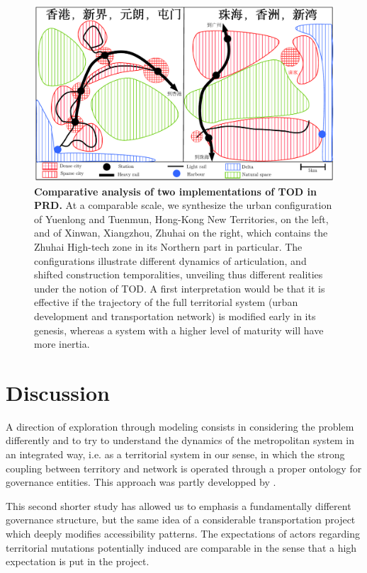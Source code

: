 \begin{figure}
	\includegraphics[width=\linewidth]{figures/tod.pdf}
	\caption{\textbf{Comparative analysis of two implementations of TOD in PRD.} At a comparable scale, we synthesize the urban configuration of Yuenlong and Tuenmun, Hong-Kong New Territories, on the left, and of Xinwan, Xiangzhou, Zhuhai on the right, which contains the Zhuhai High-tech zone in its Northern part in particular. The configurations illustrate different dynamics of articulation, and shifted construction temporalities, unveiling thus different realities under the notion of TOD. A first interpretation would be that it is effective if the trajectory of the full territorial system (urban development and transportation network) is modified early in its genesis, whereas a system with a higher level of maturity will have more inertia.\label{fig:qualitative:schema}}
\end{figure}





\section{Discussion}


A direction of exploration through modeling consists in considering the problem differently and to try to understand the dynamics of the metropolitan system in an integrated way, i.e. as a territorial system in our sense, in which the strong coupling between territory and network is operated through a proper ontology for governance entities. This approach was partly developped by .

This second shorter study has allowed us to emphasis a fundamentally different governance structure, but the same idea of a considerable transportation project which deeply modifies accessibility patterns. The expectations of actors regarding territorial mutations potentially induced are comparable in the sense that a high expectation is put in the project.

